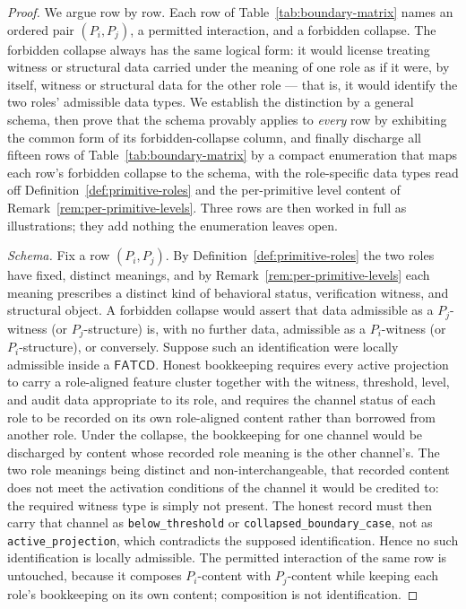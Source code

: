 \documentclass[11pt]{article}
\theoremstyle{definition}
\newcommand{\FATCD}{\ensuremath{\mathsf{FATCD}}}
\newcommand{\activeproj}{\texttt{active\_projection}}
\newcommand{\belowthr}{\texttt{below\_threshold}}
\newcommand{\collapsedbc}{\texttt{collapsed\_boundary\_case}}
\begin{document}
\begin{proof}
We argue row by row. Each row of Table~\ref{tab:boundary-matrix} names an
ordered pair \((P_i,P_j)\), a permitted interaction, and a forbidden
collapse. The forbidden collapse always has the same logical form: it would
license treating witness or structural data carried under the meaning of one
role as if it were, by itself, witness or structural data for the other role
--- that is, it would identify the two roles' admissible data types. We
establish the distinction by a general schema, then prove that the schema
provably applies to \emph{every} row by exhibiting the common form of its
forbidden-collapse column, and finally discharge all fifteen rows of
Table~\ref{tab:boundary-matrix} by a compact enumeration that maps each row's
forbidden collapse to the schema, with the role-specific data types read off
Definition~\ref{def:primitive-roles} and the per-primitive level content of
Remark~\ref{rem:per-primitive-levels}. Three rows are then worked in full as
illustrations; they add nothing the enumeration leaves open.

\emph{Schema.} Fix a row \((P_i,P_j)\). By
Definition~\ref{def:primitive-roles} the two roles have fixed, distinct
meanings, and by Remark~\ref{rem:per-primitive-levels} each meaning prescribes
a distinct kind of behavioral status, verification witness, and structural
object. A forbidden collapse would assert that data admissible as a
\(P_j\)-witness (or \(P_j\)-structure) is, with no further data,
admissible as a \(P_i\)-witness (or \(P_i\)-structure), or conversely.
Suppose such an identification were locally admissible inside a \FATCD{}.
Honest bookkeeping requires every active projection to carry a role-aligned
feature cluster together with the witness, threshold, level, and audit data
appropriate to its role, and requires the channel status of each role to be
recorded on its own role-aligned content rather than borrowed from another
role. Under the collapse, the bookkeeping for one channel would be discharged
by content whose recorded role meaning is the other channel's. The two role
meanings being distinct and non-interchangeable, that recorded content does not
meet the activation conditions of the channel it would be credited to: the
required witness type is simply not present. The honest record must then carry
that channel as \belowthr{} or \collapsedbc{}, not as \activeproj{}, which
contradicts the supposed identification. Hence no such identification is
locally admissible. The permitted interaction of the same row is untouched,
because it composes \(P_i\)-content with \(P_j\)-content while keeping
each role's bookkeeping on its own content; composition is not identification.


\end{proof}
\end{document}
